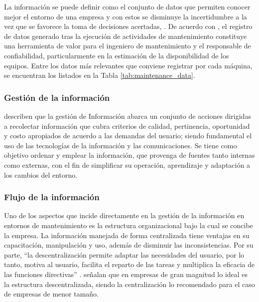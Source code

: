         La información se puede definir como el conjunto de datos que permiten conocer mejor el entorno de una empresa y con estos se disminuye la incertidumbre a la vez que se favorece la toma de decisiones acertadas, \parencite{LAPIEDRA:2021}. De acuerdo con \textcite{AENOR:2016}, el registro de datos generado tras la ejecución de actividades de mantenimiento constituye una herramienta de valor para el ingeniero de mantenimiento y el responsable de confiabilidad, particularmente en la estimación de la disponibilidad de los equipos. Entre los datos más relevantes que conviene registrar por cada máquina, se encuentran los listados en la Tabla \ref{tab:maintenance_data}.

        

        \subsubsection{Gestión de la información}

            \textcite{FONT:2014} describen que la gestión de Información abarca un conjunto de acciones dirigidas a recolectar información que cubra criterios de calidad, pertinencia, oportunidad y costo apropiados de acuerdo a las demandas del usuario; siendo fundamental el uso de las tecnologías de la información y las comunicaciones. Se tiene como objetivo ordenar y emplear la información, que provenga de fuentes tanto internas como externas, con el fin de simplificar su operación, aprendizaje y adaptación a los cambios del entorno.

        \subsubsection{Flujo de la información}

            Uno de los aspectos que incide directamente en la gestión de la información en entornos de mantenimiento es la estructura organizacional bajo la cual se concibe la empresa. La información manejada de forma centralizada tiene ventajas en su capacitación, manipulación y uso, además de disminuir las inconsistencias. Por su parte, “la descentralización permite adaptar las necesidades del usuario, por lo tanto, motiva al usuario, facilita el reparto de las tareas y multiplica la eficacia de las funciones directivas” \parencite[p. 3]{ARRIBAS:2000}. \textcite[p. 7]{BEN-DAYA:2009} señalan que en empresas de gran magnitud lo ideal es la estructura descentralizada, siendo la centralización lo recomendado para el caso de empresas de menor tamaño.

